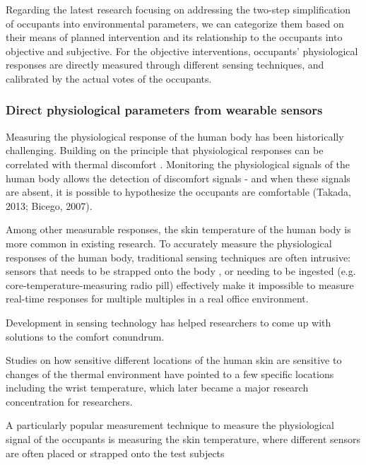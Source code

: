 Regarding the latest research focusing on addressing the two-step simplification of occupants into environmental parameters, we can categorize them based on their means of planned intervention and its relationship to the occupants into objective and subjective. For the objective interventions, occupants' physiological responses are directly measured through different sensing techniques, and calibrated by the actual votes of the occupants. 

\subsubsection{Direct physiological parameters from wearable sensors}
Measuring the physiological response of the human body has been historically challenging. Building on the principle that physiological responses can be correlated with thermal discomfort \cite{huizenga_skin_2004,}. Monitoring the physiological signals of the human body allows the detection of discomfort signals - and when these signals are absent, it is possible to hypothesize the occupants are comfortable (Takada, 2013; Bicego, 2007). 


Among other measurable responses, the skin temperature of the human body is more common in existing research. To accurately measure the physiological responses of the human body, traditional sensing techniques are often intrusive: sensors that needs to be strapped onto the body \cite{mccarthy_validation_2016}, or needing to be ingested (e.g. core-temperature-measuring radio pill) effectively make it impossible to measure real-time responses for multiple multiples in a real office environment. 

Development in sensing technology has helped researchers to come up with solutions to the comfort conundrum. 

Studies on how sensitive different locations of the human skin are sensitive to changes of the thermal environment have pointed to a few specific locations including the wrist temperature, which later became a major research concentration for researchers\cite{choi_cobi:_2010}. 

A particularly popular measurement technique to measure the physiological signal of the occupants is measuring the skin temperature, where different sensors are often placed or strapped onto the test subjects\cite{}

